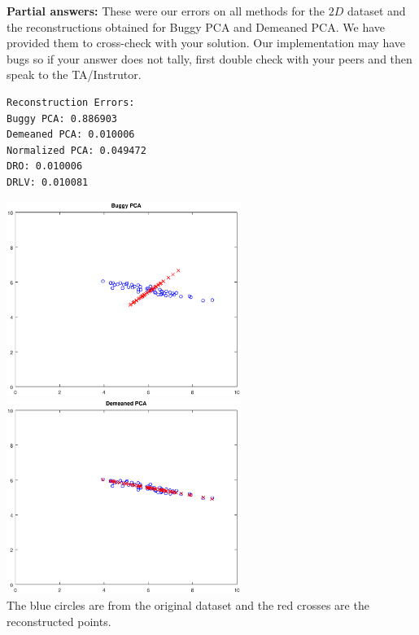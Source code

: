 
\textbf{Partial answers:}
These were our errors on all methods for the $2D$ dataset and the reconstructions obtained for Buggy PCA and Demeaned PCA.
We have provided them to cross-check with your solution.
Our implementation may have bugs so if your answer does not tally, first double check with your peers and then speak to the TA/Instrutor.
\begin{verbatim}
Reconstruction Errors:
Buggy PCA: 0.886903
Demeaned PCA: 0.010006
Normalized PCA: 0.049472
DRO: 0.010006
DRLV: 0.010081
\end{verbatim}

\includegraphics[width=3in]{pcaprog/buggy_pca} \hspace{0.4in}
\includegraphics[width=3in]{pcaprog/demeaned_pca} \\
The blue circles are from the original dataset and the red crosses are the reconstructed points.

\vspace{0.2in}



